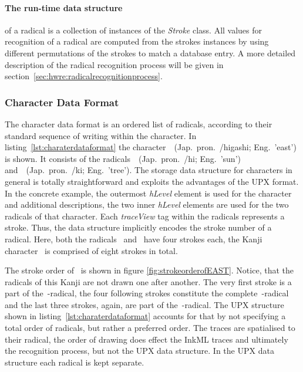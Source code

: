 \paragraph{The run-time data structure} of a radical is a collection of instances
of the \emph{Stroke} class.
All values for recognition of a radical are computed from the strokes instances
by using different permutations of the strokes to match a database entry. A more
detailed description of the radical recognition process will be given in
section~\ref{sec:hwre:radicalrecognitionprocess}.

\subsubsection{Character Data Format}
\label{sec:hwre:characterdataformat}

The character data format is an ordered list of radicals, according to their
standard sequence of writing within the character. In 
listing~\ref{lst:charaterdataformat} the 
character~~(Jap.\ pron.\ /higashi; Eng.\ 'east') 
is shown.
It consists of the 
radicals~~(Jap.\ pron.\ /hi; Eng.\ 'sun')
and~~(Jap.\ pron.\ /ki; Eng.\ 'tree').
The storage data structure 
for characters in general is totally straightforward and exploits the 
advantages of the UPX format.
In the concrete example, the outermost \emph{hLevel} element is used for the 
character and additional descriptions, the two inner \emph{hLevel} elements are 
used for the two radicals of that character. Each \emph{traceView} tag within 
the radicals represents a stroke. Thus, the data structure implicitly encodes
the stroke number of a radical. Here, both the radicals~ and~
have four strokes each, the Kanji character~ is comprised of 
eight strokes in total.

The stroke order of~ is shown in figure \ref{fig:strokeorderofEAST}.
Notice, that the radicals of this Kanji are not drawn one after another.
The very first stroke is a part of the~-radical, the four following
strokes constitute the complete~-radical and the last three strokes,
again, are part of the~-radical.
The UPX structure shown in listing~\ref{lst:charaterdataformat} accounts for
that by not specifying a total order of radicals, but rather a preferred order.
The traces are spatialised to their radical, the order of drawing does effect
the InkML traces and ultimately the recognition process, 
but not the UPX data structure. In the UPX data structure each radical is kept
separate.

